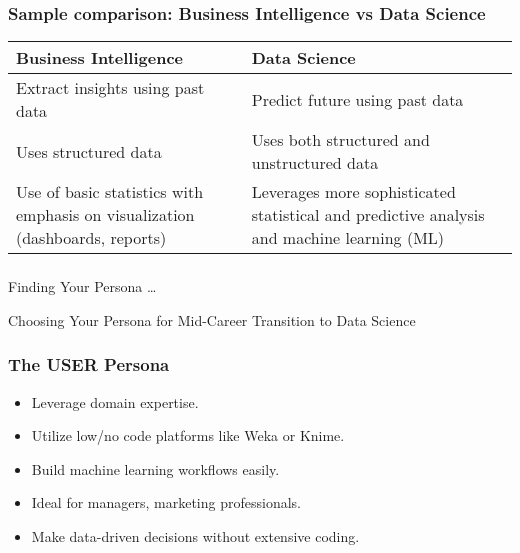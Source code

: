 \begin{frame}[fragile]\frametitle{Sample comparison: Business Intelligence vs Data Science}
\begin{table}[]
\begin{tabular}{p{}p{}}
\hline
{\bf Business Intelligence} & {\bf Data Science}         	\\ \hline
Extract insights using past data    & Predict future using past data       		\\ \hline
Uses structured data      & Uses both structured and unstructured data  				\\ \hline
Use of basic statistics with emphasis on visualization (dashboards, reports)    & Leverages more sophisticated statistical and predictive analysis and machine learning (ML)            	\\ \hline
\end{tabular}
\end{table}
\end{frame}

\begin{frame}[fragile]\frametitle{}
	
	\begin{center}
	{\Large Finding Your Persona \ldots

	Choosing Your Persona for Mid-Career Transition to Data Science}  
	\end{center}

\end{frame}



\begin{frame}[fragile]\frametitle{The USER Persona}
        \begin{itemize}
            \item Leverage domain expertise.
            \item Utilize low/no code platforms like Weka or Knime.
            \item Build machine learning workflows easily.
            \item Ideal for managers, marketing professionals.
            \item Make data-driven decisions without extensive coding.
        \end{itemize}
\end{frame}

